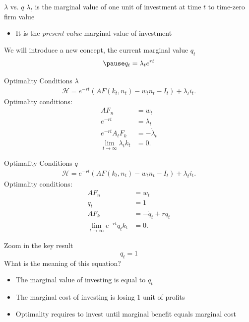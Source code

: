\documentclass[11pt,aspectratio=169,xcolor={dvipsnames},hyperref={pdftex,pdfpagemode=UseNone,hidelinks,pdfdisplaydoctitle=true},usepdftitle=false]{beamer}
\begin{document}
\begin{frame}{$\lambda$ vs. $q$}
\pause
$\lambda_t$ is the marginal value of one unit of investment at time $t$ to time-zero firm value
\begin{itemize}
\pause
\item It is the \textit{present value} marginal value of investment
\end{itemize}
\pause
We will introduce a new concept, the current marginal value $q_t$
\begin{align}
\pause
q_t = \lambda_t e^{rt}
\end{align}
\end{frame}

\begin{frame}{Optimality Conditions $\lambda$}
\begin{align}
\mathcal{H} = e^{-rt} \left(A F(k_t,n_t) - w_t n_t -  I_t \right) + \lambda_t i_t.
\end{align}
\pause
Optimality conditions:
\pause
\begin{align}
A F_n &= w_t\\
e^{-rt} &= \lambda_t \\
e^{-rt} A_t F_k &= -\dot{\lambda}_t \\
\lim_{t\rightarrow \infty} \lambda_t k_t &= 0.
\end{align}
\end{frame}


\begin{frame}{Optimality Conditions $q$}
\begin{align}
\mathcal{H} = e^{-rt} \left(A F(k_t,n_t) - w_t n_t -  I_t \right) + \lambda_t i_t.
\end{align}
\pause
Optimality conditions:
\begin{align}
A F_n &= w_t\\
q_t &= 1 \\
A F_k &= - \dot{q}_t + r q_t\\
\lim_{t\rightarrow \infty} e^{-rt} q_t k_t &= 0.
\end{align}
\end{frame}

\begin{frame}{Zoom in the key result}
$$q_t = 1$$
\pause
What is the meaning of this equation?
\pause
\begin{itemize}
\item The marginal value of investing is equal to $q_t$
\pause
\item The marginal cost of investing is losing 1 unit of profits
\pause
\item Optimality requires to invest until marginal benefit equals marginal cost
\end{itemize}
\end{frame}
\end{document}
